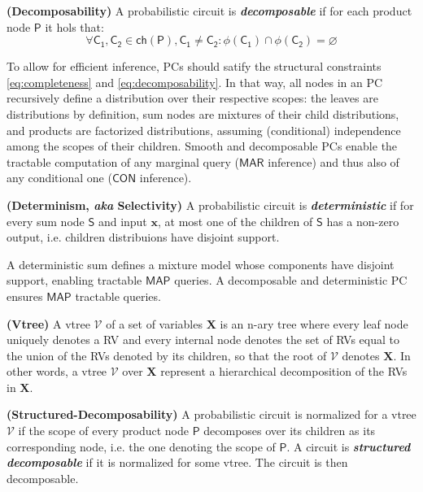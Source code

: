 \begin{definition}{\textbf{(Decomposability)}}
A probabilistic circuit is \textbf{\textit{decomposable}} if for each product node $\mathsf{P}$ it hols that:
\begin{equation}\label{eq:decomposability}
\forall \mathsf{C_1},\mathsf{C_2} \in \mathsf{ch}(\mathsf{P}), \mathsf{C_1} \neq \mathsf{C_2} : \phi(\mathsf{C_1}) \cap \phi(\mathsf{C_2}) = \varnothing
\end{equation}
\end{definition}

\noindent  To allow for efficient inference, PCs should satify the structural constraints \ref{eq:completeness} and \ref{eq:decomposability}.
In that way, all nodes in an PC recursively define a distribution over their respective scopes: the leaves are distributions by definition, sum nodes are mixtures of their child distributions, and products are factorized distributions, assuming (conditional) independence among the scopes of their children.
Smooth and decomposable PCs enable the tractable computation of any marginal query ($\mathsf{MAR}$ inference) and thus also of any conditional one ($\mathsf{CON}$ inference).

\begin{definition}{\textbf{(Determinism, \textit{aka} Selectivity)}}
A probabilistic circuit is \textbf{\textit{deterministic}} if for every sum node $\mathsf{S}$ and input $\mathbf{x}$, at most one of the children of $\mathsf{S}$ has a non-zero output, i.e. children distribuions have disjoint support.
\end{definition}

\noindent A deterministic sum defines a mixture model whose components have disjoint support, enabling tractable $\mathsf{MAP}$ queries.
A decomposable and deterministic PC ensures $\mathsf{MAP}$ tractable queries.

\begin{definition}{\textbf{(Vtree)}} A vtree $\mathcal{V}$ of a set of variables $\mathbf{X}$ is an n-ary tree where every leaf node uniquely denotes a RV and every internal node denotes the set of RVs equal to the union of the RVs denoted by its children, so that the root of $\mathcal{V}$ denotes $\mathbf{X}$.
In other words, a vtree $\mathcal{V}$ over $\mathbf{X}$ represent a hierarchical decomposition of the RVs in $\mathbf{X}$.
\end{definition}

\begin{definition}{\textbf{(Structured-Decomposability)}} A probabilistic circuit is normalized for a vtree $\mathcal{V}$ if the scope of every product node $\mathsf{P}$ decomposes over its children as its corresponding node, i.e. the one denoting the scope of $\mathsf{P}$.
A circuit is \textbf{\textit{structured decomposable}} if it is normalized for some vtree.
The circuit is then decomposable.
\end{definition}

